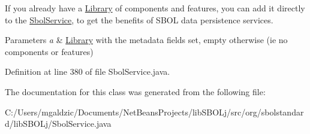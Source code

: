 If you already have a \hyperlink{classorg_1_1sbolstandard_1_1lib_s_b_o_lj_1_1_library}{Library} of components and features, you can add it directly to the \hyperlink{classorg_1_1sbolstandard_1_1lib_s_b_o_lj_1_1_sbol_service}{SbolService}, to get the benefits of SBOL data persistence services.


\begin{DoxyParams}{Parameters}
{\em a} & \hyperlink{classorg_1_1sbolstandard_1_1lib_s_b_o_lj_1_1_library}{Library} with the metadata fields set, empty otherwise (ie no components or features) \\
\hline
\end{DoxyParams}


Definition at line 380 of file SbolService.java.



The documentation for this class was generated from the following file:\begin{DoxyCompactItemize}
\item 
C:/Users/mgaldzic/Documents/NetBeansProjects/libSBOLj/src/org/sbolstandard/libSBOLj/SbolService.java\end{DoxyCompactItemize}
